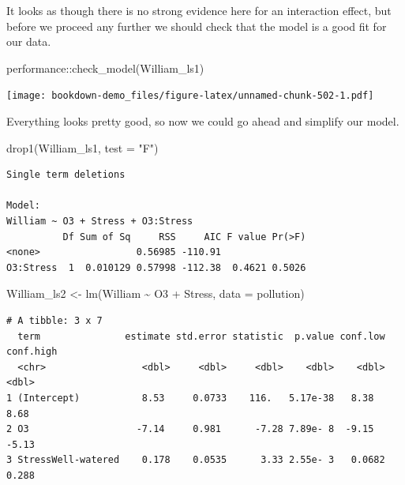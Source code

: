 \documentclass[
]{book}
\newenvironment{Shaded}{\begin{snugshade}}{\end{snugshade}}
\newcommand{\AttributeTok}[1]{\textcolor[rgb]{0.77,0.63,0.00}{#1}}
\newcommand{\FunctionTok}[1]{\textcolor[rgb]{0.00,0.00,0.00}{#1}}
\newcommand{\NormalTok}[1]{#1}
\newcommand{\OtherTok}[1]{\textcolor[rgb]{0.56,0.35,0.01}{#1}}
\newcommand{\SpecialCharTok}[1]{\textcolor[rgb]{0.00,0.00,0.00}{#1}}
\newcommand{\StringTok}[1]{\textcolor[rgb]{0.31,0.60,0.02}{#1}}
\begin{document}
It looks as though there is no strong evidence here for an interaction effect, but before we proceed any further we should check that the model is a good fit for our data.

\begin{Shaded}
\begin{Highlighting}[]
\NormalTok{performance}\SpecialCharTok{::}\FunctionTok{check\_model}\NormalTok{(William\_ls1)}
\end{Highlighting}
\end{Shaded}

\texttt{[image: bookdown-demo\_files/figure-latex/unnamed-chunk-502-1.pdf]}

Everything looks pretty good, so now we could go ahead and simplify our model.

\begin{Shaded}
\begin{Highlighting}[]
\FunctionTok{drop1}\NormalTok{(William\_ls1, }\AttributeTok{test =} \StringTok{"F"}\NormalTok{)}
\end{Highlighting}
\end{Shaded}

\begin{verbatim}
Single term deletions

Model:
William ~ O3 + Stress + O3:Stress
          Df Sum of Sq     RSS     AIC F value Pr(>F)
<none>                 0.56985 -110.91               
O3:Stress  1  0.010129 0.57998 -112.38  0.4621 0.5026
\end{verbatim}

\begin{Shaded}
\begin{Highlighting}[]
\NormalTok{William\_ls2 }\OtherTok{\textless{}{-}} \FunctionTok{lm}\NormalTok{(William }\SpecialCharTok{\textasciitilde{}}\NormalTok{ O3 }\SpecialCharTok{+}\NormalTok{ Stress, }\AttributeTok{data =}\NormalTok{ pollution) }
\end{Highlighting}
\end{Shaded}

\begin{verbatim}
# A tibble: 3 x 7
  term               estimate std.error statistic  p.value conf.low conf.high
  <chr>                 <dbl>     <dbl>     <dbl>    <dbl>    <dbl>     <dbl>
1 (Intercept)           8.53     0.0733    116.   5.17e-38   8.38       8.68 
2 O3                   -7.14     0.981      -7.28 7.89e- 8  -9.15      -5.13 
3 StressWell-watered    0.178    0.0535      3.33 2.55e- 3   0.0682     0.288
\end{verbatim}
\end{document}
